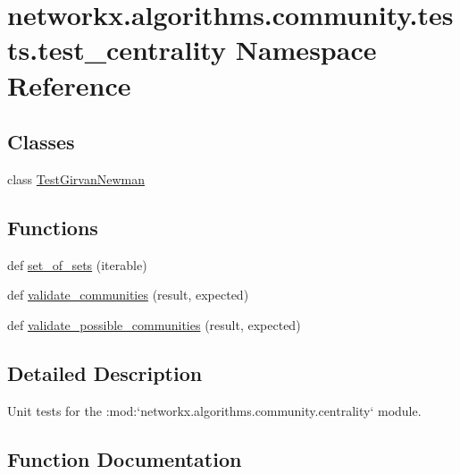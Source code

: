 \hypertarget{namespacenetworkx_1_1algorithms_1_1community_1_1tests_1_1test__centrality}{}\section{networkx.\+algorithms.\+community.\+tests.\+test\+\_\+centrality Namespace Reference}
\label{namespacenetworkx_1_1algorithms_1_1community_1_1tests_1_1test__centrality}
\subsection*{Classes}
\begin{DoxyCompactItemize}
\item 
class \hyperlink{classnetworkx_1_1algorithms_1_1community_1_1tests_1_1test__centrality_1_1TestGirvanNewman}{Test\+Girvan\+Newman}
\end{DoxyCompactItemize}
\subsection*{Functions}
\begin{DoxyCompactItemize}
\item 
def \hyperlink{namespacenetworkx_1_1algorithms_1_1community_1_1tests_1_1test__centrality_a7efe6a2ecc5bb5dcd86d32a81a24788f}{set\+\_\+of\+\_\+sets} (iterable)
\item 
def \hyperlink{namespacenetworkx_1_1algorithms_1_1community_1_1tests_1_1test__centrality_abb351f8d4634079f2d1d3dbf19347c2e}{validate\+\_\+communities} (result, expected)
\item 
def \hyperlink{namespacenetworkx_1_1algorithms_1_1community_1_1tests_1_1test__centrality_ad807a616a0be3af0b80827ed41ddada2}{validate\+\_\+possible\+\_\+communities} (result, expected)
\end{DoxyCompactItemize}


\subsection{Detailed Description}
\begin{DoxyVerb}Unit tests for the :mod:`networkx.algorithms.community.centrality`
module.\end{DoxyVerb}
 

\subsection{Function Documentation}
\mbox{\label{namespacenetworkx_1_1algorithms_1_1community_1_1tests_1_1test__centrality_a7efe6a2ecc5bb5dcd86d32a81a24788f}} 
